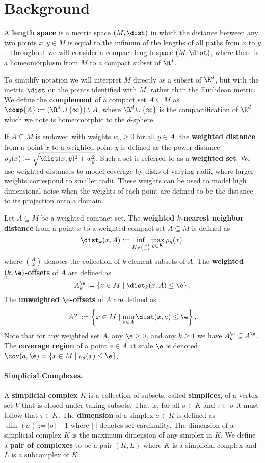 \section{Background} %
\label{sec:background}

A \textbf{length space} is a metric space $(M,\dist)$ in which the distance between any two points $x,y\in M$ is equal to the infimum of the lengths of all paths from $x$ to $y$.
Throughout we will consider a compact length space $(M,\dist)$, where there is a homeomorphism from $M$ to a compact subset of $\R^d$.

To simplify notation we will interpret $M$ directly as a subset of $\R^d$, but with the metric $\dist$ on the points identified with $M$, rather than the Euclidean metric.
We define the \textbf{complement} of a compact set $A\subseteq M$ as $\comp{A} := (\R^d\cup\{\infty\})\setminus A$, where $\R^d\cup\{\infty\}$ is the compactification of $\R^d$, which we note is homeomorphic to the $d$-sphere.


If $A\subseteq M$ is endowed with weights $w_y\geq 0$ for all $y\in A$, the \textbf{weighted distance} from a point $x$ to a weighted point $y$ is defined as the power distance $\rho_y(x) :=\sqrt{\dist(x,y)^2+w_y^2}$.
Such a set is referred to as a \textbf{weighted set}.
We use weighted distances to model coverage by disks of varying radii, where larger weights correspond to smaller radii.
These weights can be used to model high dimensional noise when the weights of each point are defined to be the distance to its projection onto a domain.

Let $A\subseteq M$ be a weighted compact set.
The \textbf{weighted $k$-nearest neighbor distance} from a point $x$ to a weighted compact set $A\subseteq M$ is defined as
\[
    \dist_k(x, A) :=\inf_{K\in {A\choose k}}\max_{y\in K} \rho_y(x).
\]
where $A\choose k$ denotes the collection of $k$-element subsets of $A$.
The \textbf{weighted $(k,\e)$-offsets} of $A$ are defined as
\[
    A^\e_k := \left\{ x\in M\mid\dist_k(x,A)\leq\e\right\}.
\]
The \textbf{unweighted $\e$-offsets} of $A$ are defined as
\[
    A^\e := \left\{ x\in M\mid \min_{a\in A}\dist(x,a)\le\e\right\},
\]
Note that for any weighted set $A$, any $\e\ge 0 $, and any $k\ge 1$ we have  $A^\e_k\subseteq A^\e$.
The \textbf{coverage region} of a point $a\in A$ at scale $\e$ is denoted $\cov(a,\e) = \left\{x\in M\mid\rho_a(x)\le \e\right\}$.

\paragraph*{\textbf{Simplicial Complexes.}}
    A \textbf{simplicial complex} $K$ is a collection of subsets, called \textbf{simplices}, of a vertex set $V$ that is closed under taking subsets.
    That is, for all $\sigma\in K$ and $\tau\subset\sigma$ it must follow that $\tau\in K$.
    The \textbf{dimension} of a simplex $\sigma\in K$ is defined as $\dim(\sigma) := |\sigma|-1$ where $|\cdot|$ denotes set cardinality.
    The dimension of a simplicial complex $K$ is the maximum dimension of any simplex in $K$.
    We define a \textbf{pair of complexes} to be a pair $(K,L)$ where $K$ is a simplicial complex and $L$ is a subcomplex of $K$.

